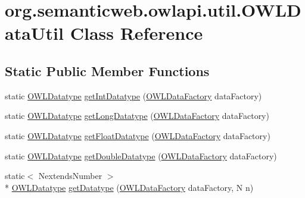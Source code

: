 \hypertarget{classorg_1_1semanticweb_1_1owlapi_1_1util_1_1_o_w_l_data_util}{\section{org.\-semanticweb.\-owlapi.\-util.\-O\-W\-L\-Data\-Util Class Reference}
\label{classorg_1_1semanticweb_1_1owlapi_1_1util_1_1_o_w_l_data_util}
}
\subsection*{Static Public Member Functions}
\begin{DoxyCompactItemize}
\item 
static \hyperlink{interfaceorg_1_1semanticweb_1_1owlapi_1_1model_1_1_o_w_l_datatype}{O\-W\-L\-Datatype} \hyperlink{classorg_1_1semanticweb_1_1owlapi_1_1util_1_1_o_w_l_data_util_abb80b5fb260a5baccc69285204840d2a}{get\-Int\-Datatype} (\hyperlink{interfaceorg_1_1semanticweb_1_1owlapi_1_1model_1_1_o_w_l_data_factory}{O\-W\-L\-Data\-Factory} data\-Factory)
\item 
static \hyperlink{interfaceorg_1_1semanticweb_1_1owlapi_1_1model_1_1_o_w_l_datatype}{O\-W\-L\-Datatype} \hyperlink{classorg_1_1semanticweb_1_1owlapi_1_1util_1_1_o_w_l_data_util_a83f3337e0b3bfa7d13d002c57ba9343c}{get\-Long\-Datatype} (\hyperlink{interfaceorg_1_1semanticweb_1_1owlapi_1_1model_1_1_o_w_l_data_factory}{O\-W\-L\-Data\-Factory} data\-Factory)
\item 
static \hyperlink{interfaceorg_1_1semanticweb_1_1owlapi_1_1model_1_1_o_w_l_datatype}{O\-W\-L\-Datatype} \hyperlink{classorg_1_1semanticweb_1_1owlapi_1_1util_1_1_o_w_l_data_util_a7a8394f1e1ce567f87017d57189304dd}{get\-Float\-Datatype} (\hyperlink{interfaceorg_1_1semanticweb_1_1owlapi_1_1model_1_1_o_w_l_data_factory}{O\-W\-L\-Data\-Factory} data\-Factory)
\item 
static \hyperlink{interfaceorg_1_1semanticweb_1_1owlapi_1_1model_1_1_o_w_l_datatype}{O\-W\-L\-Datatype} \hyperlink{classorg_1_1semanticweb_1_1owlapi_1_1util_1_1_o_w_l_data_util_ae36a72c79e2b7aee119c6591ad5c5db6}{get\-Double\-Datatype} (\hyperlink{interfaceorg_1_1semanticweb_1_1owlapi_1_1model_1_1_o_w_l_data_factory}{O\-W\-L\-Data\-Factory} data\-Factory)
\item 
static$<$ Nextends\-Number $>$\\*
 \hyperlink{interfaceorg_1_1semanticweb_1_1owlapi_1_1model_1_1_o_w_l_datatype}{O\-W\-L\-Datatype} \hyperlink{classorg_1_1semanticweb_1_1owlapi_1_1util_1_1_o_w_l_data_util_aeb4a5419c1c1b7016d9e35bbb32a6505}{get\-Datatype} (\hyperlink{interfaceorg_1_1semanticweb_1_1owlapi_1_1model_1_1_o_w_l_data_factory}{O\-W\-L\-Data\-Factory} data\-Factory, N n)

\end{DoxyCompactItemize}

